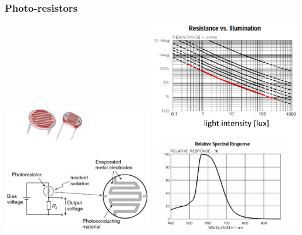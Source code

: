 \documentclass[11pt]{article}
\begin{document}
\subsubsection{Photo-resistors}
\label{sec:orgc1476d1}
\begin{center}
\includegraphics[width=0.49\textwidth]{./images/photo-resistor-circuit-and-image.png}
\includegraphics[width=0.49\textwidth]{./images/photo-resistor-graphs.png}
\end{center}

 \newpage
\end{document}
